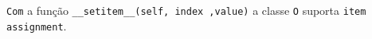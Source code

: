 \documentclass[12pt,varwidth=16cm,border=1pt]{standalone}
\begin{document}
\verb+Com+ a função \verb+__setitem__(self, index ,value)+ a classe \verb+O+  suporta \verb+item assignment+.

\questiomtrue
\end{document}
